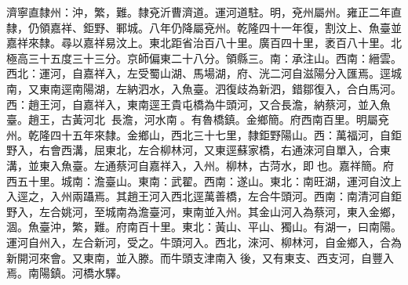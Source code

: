 \begin{pinyinscope}
濟寧直隸州：沖，繁，難。隸兗沂曹濟道。運河道駐。明，兗州屬州。雍正二年直隸，仍領嘉祥、鉅野、鄆城。八年仍降屬兗州。乾隆四十一年復，割汶上、魚臺並嘉祥來隸。尋以嘉祥易汶上。東北距省治百八十里。廣百四十里，袤百八十里。北極高三十五度三十三分。京師偏東二十八分。領縣三。南：承注山。西南：縉雲。西北：運河，自嘉祥入，左受蜀山湖、馬場湖，府、洸二河自滋陽分入匯焉。逕城南，又東南逕南陽湖，左納泗水，入魚臺。泗復歧為新泗，錯鄒復入，合白馬河。西：趙王河，自嘉祥入，東南逕王貴屯橋為牛頭河，又合長澹，納蔡河，並入魚臺。趙王，古黃河北，長澹，河水南。有魯橋鎮。金鄉簡。府西南百里。明屬兗州。乾隆四十五年來隸。金鄉山，西北三十七里，隸鉅野陽山。西：萬福河，自鉅野入，右會西溝，屈東北，左合柳林河，又東逕蘇家橋，右通淶河自單入，合東溝，並東入魚臺。左通蔡河自嘉祥入，入州。柳林，古菏水，即也。嘉祥簡。府西五十里。城南：澹臺山。東南：武翟。西南：遂山。東北：南旺湖，運河自汶上入逕之，入州兩躡焉。其趙王河入西北逕萬善橋，左合牛頭河。西南：南清河自鉅野入，左合姚河，至城南為澹臺河，東南並入州。其金山河入為蔡河，東入金鄉，涸。魚臺沖，繁，難。府南百十里。東北：黃山、平山、獨山。有湖一，曰南陽。運河自州入，左合新河，受之。牛頭河入。西北，淶河、柳林河，自金鄉入，合為新開河來會。又東南，並入滕。而牛頭支津南入後，又有東支、西支河，自豐入焉。南陽鎮。河橋水驛。


\end{pinyinscope}
